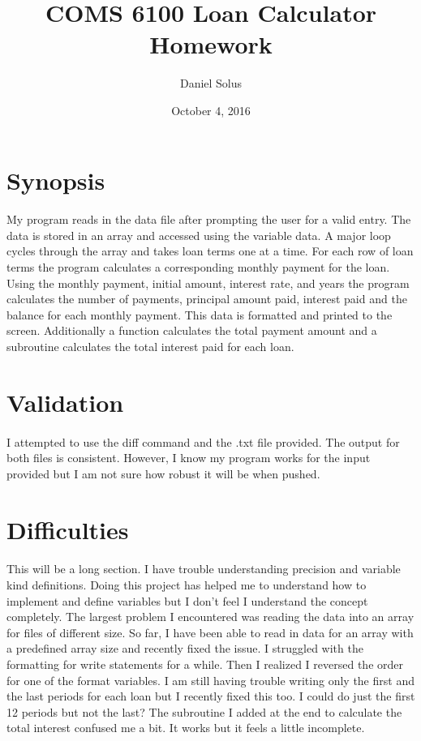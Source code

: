 \documentclass[11pt]{article}
\title{COMS 6100 Loan Calculator Homework}
\author{Daniel Solus}
\date{October 4, 2016}
\begin{document}
\maketitle

\section{Synopsis}
\paragraph{} My program reads in the data file after prompting the user for a valid entry. The data is stored in an array and accessed using the variable data. A major loop cycles through the array and takes loan terms one at a time. For each row of loan terms the program calculates a corresponding monthly payment for the loan. Using the monthly payment, initial amount, interest rate, and years the program calculates the number of payments, principal amount paid, interest paid and the balance for each monthly payment. This data is formatted  and printed to the screen. Additionally a function calculates the total payment amount and a subroutine calculates the total interest paid for each loan.

\section{Validation}
\paragraph{} I attempted to use the diff command and the .txt file provided. The output for both files is consistent. However, I know my program works for the input provided but I am not sure how robust it will be when pushed.

\section{Difficulties}
\paragraph{} This will be a long section. I have trouble understanding precision and variable kind definitions. Doing this project has helped me to understand how to implement and define variables but I don't feel I understand the concept completely. The largest problem I encountered was reading the data into an array for files of different size. So far, I have been able to read in data for an array with a predefined array size and recently fixed the issue. I struggled with the formatting for write statements for a while. Then I realized I reversed the order for one of the format variables. I am still having trouble writing only the first and the last periods for each loan but I recently fixed this too. I could do just the first 12 periods but not the last? The subroutine I added at the end to calculate the total interest confused me a bit. It works but it feels a little incomplete.
\end{document}
